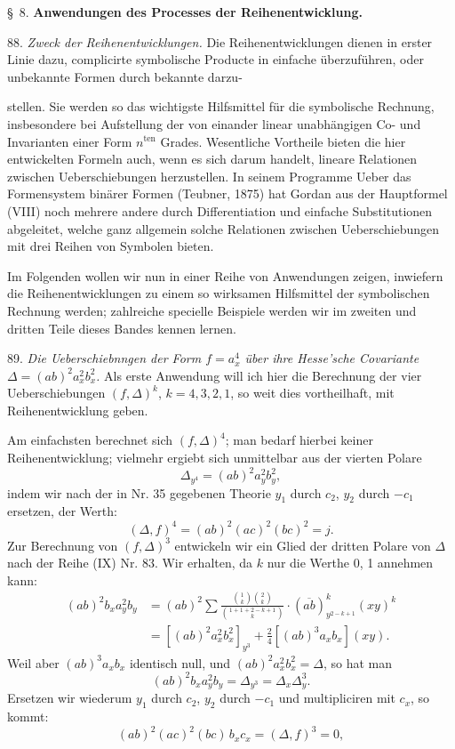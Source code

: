 \documentclass[11pt]{article}
\providecommand{\weberpage}[1]{}
\providecommand{\weq}[2]{\begin{equation}\tag{#1}#2\end{equation}}
\let\Delta\varDelta
\begin{document}
\S~8. \textbf{Anwendungen des Processes der Reihenentwicklung.}

88. \textit{Zweck der Reihenentwicklungen.} Die Reihenentwicklungen dienen in erster Linie dazu, complicirte symbolische Producte in einfache \"uberzuf\"uhren, oder unbekannte Formen durch bekannte darzu-


\weberpage{91}
stellen. Sie werden so das wichtigste Hilfsmittel f\"ur die symbolische Rechnung, insbesondere bei Aufstellung der von einander linear unabh\"angigen Co- und Invarianten einer Form $n^{\mathrm{ten}}$ Grades. Wesentliche Vortheile bieten die hier entwickelten Formeln auch, wenn es sich darum handelt, lineare Relationen zwischen Ueberschiebungen herzustellen. In seinem Programme \glqq Ueber das Formensystem bin\"arer Formen\grqq{} (Teubner, 1875) hat Gordan aus der Hauptformel (VIII) noch mehrere andere durch Differentiation und einfache Substitutionen abgeleitet, welche ganz allgemein solche Relationen zwischen Ueberschiebungen mit drei Reihen von Symbolen bieten.

Im Folgenden wollen wir nun in einer Reihe von Anwendungen zeigen, inwiefern die Reihenentwicklungen zu einem so wirksamen Hilfsmittel der symbolischen Rechnung werden; zahlreiche specielle Beispiele werden wir im zweiten und dritten Teile dieses Bandes kennen lernen.

89. \textit{Die Ueberschiebnngen der Form $f = a_x^4$ \"uber ihre Hesse'sche Covariante $\Delta = (ab)^2 a_x^2 b_x^2$.} %
Als erste Anwendung will ich hier die Berechnung der vier Ueberschiebungen $(f,\Delta)^k$, $k=4,3,2,1$, so weit dies vortheilhaft, mit Reihenentwicklung geben.

Am einfachsten berechnet sich $(f,\Delta)^4$; man bedarf hierbei keiner Reihenentwicklung; vielmehr ergiebt sich unmittelbar aus der vierten Polare
\[
\Delta_{y^4} = (ab)^2 a_y^2 b_y^2,
\]
indem wir nach der in Nr. 35 gegebenen Theorie $y_1$ durch $c_2$, $y_2$ durch $-c_1$ ersetzen, der Werth:
\weq{1}{(\Delta, f)^4 = (ab)^2(ac)^2(bc)^2 = j.}
Zur Berechnung von $(f,\Delta)^3$ entwickeln wir ein Glied der dritten Polare von $\Delta$ nach der Reihe (IX) Nr. 83. Wir erhalten, da $k$ nur die Werthe 0, 1 annehmen kann:
\[
\begin{aligned}
(ab)^2 b_x a_y^2 b_y &= (ab)^2 \sum \frac{\binom{1}{k}\binom{2}{k}}{\binom{1+1+2-k+1}{k}} \cdot (\overline{ab})^{k}_{y^{2-k+1}} (xy)^k \\
&= \left[(ab)^2 a_x^2 b_x^2\right]_{y^3} + \frac{2}{4}\left[(ab)^3 a_x b_x\right](xy). %
\end{aligned}
\]
Weil aber $(ab)^3 a_x b_x$ identisch null, und $(ab)^2 a_x^2 b_x^2 = \Delta$, so hat man
\weq{I}{(ab)^2 b_x a_y^2 b_y = \Delta_{y^3} = \Delta_x \Delta_y^3.}
Ersetzen wir wiederum $y_1$ durch $c_2$, $y_2$ durch $-c_1$ und multipliciren mit $c_x$, so kommt:
\weq{2}{(ab)^2 (ac)^2 (bc)\, b_x c_x = (\Delta, f)^3 = 0,}
\end{document}
